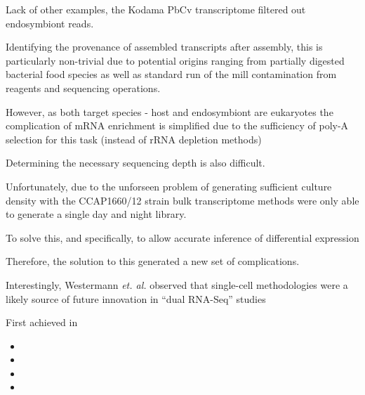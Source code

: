 Lack of other examples, the Kodama PbCv transcriptome filtered out endosymbiont reads.  


Identifying the provenance of assembled transcripts after assembly, this is particularly non-trivial due to potential
origins ranging from partially digested bacterial food species as well as standard run of the mill contamination
from reagents and sequencing operations.





However, as both target species - host and endosymbiont are eukaryotes the complication of mRNA enrichment 
is simplified due to the sufficiency of poly-A selection for this task (instead of rRNA depletion methods)

Determining the necessary sequencing depth is also difficult.



Unfortunately, due to the unforseen problem of generating sufficient culture density with the CCAP1660/12
strain bulk transcriptome methods were only able to generate a single day and night library.


To solve this, and specifically, to allow accurate inference of differential expression 




Therefore, the solution to this generated a new set of complications.


Interestingly, Westermann \textit{et. al.} observed that single-cell methodologies were a likely source of future
innovation in ``dual RNA-Seq'' studies \citep{Westermann2012}


First achieved in \citep{Lao2009}



\begin{itemize}
    \item 
    \item
    \item
    \item
\end{itemize}






